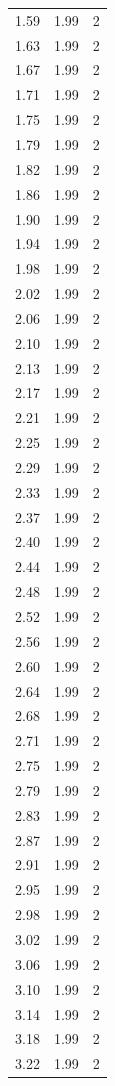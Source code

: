 \begin{longtable}{lrr}
  1.59 & 1.99 & 2 \\
  1.63 & 1.99 & 2 \\
  1.67 & 1.99 & 2 \\
  1.71 & 1.99 & 2 \\
  1.75 & 1.99 & 2 \\
  1.79 & 1.99 & 2 \\
  1.82 & 1.99 & 2 \\
  1.86 & 1.99 & 2 \\
  1.90 & 1.99 & 2 \\
  1.94 & 1.99 & 2 \\
  1.98 & 1.99 & 2 \\
  2.02 & 1.99 & 2 \\
  2.06 & 1.99 & 2 \\
  2.10 & 1.99 & 2 \\
  2.13 & 1.99 & 2 \\
  2.17 & 1.99 & 2 \\
  2.21 & 1.99 & 2 \\
  2.25 & 1.99 & 2 \\
  2.29 & 1.99 & 2 \\
  2.33 & 1.99 & 2 \\
  2.37 & 1.99 & 2 \\
  2.40 & 1.99 & 2 \\
  2.44 & 1.99 & 2 \\
  2.48 & 1.99 & 2 \\
  2.52 & 1.99 & 2 \\
  2.56 & 1.99 & 2 \\
  2.60 & 1.99 & 2 \\
  2.64 & 1.99 & 2 \\
  2.68 & 1.99 & 2 \\
  2.71 & 1.99 & 2 \\
  2.75 & 1.99 & 2 \\
  2.79 & 1.99 & 2 \\
  2.83 & 1.99 & 2 \\
  2.87 & 1.99 & 2 \\
  2.91 & 1.99 & 2 \\
  2.95 & 1.99 & 2 \\
  2.98 & 1.99 & 2 \\
  3.02 & 1.99 & 2 \\
  3.06 & 1.99 & 2 \\
  3.10 & 1.99 & 2 \\
  3.14 & 1.99 & 2 \\
  3.18 & 1.99 & 2 \\
  3.22 & 1.99 & 2 \\

\end{longtable}
